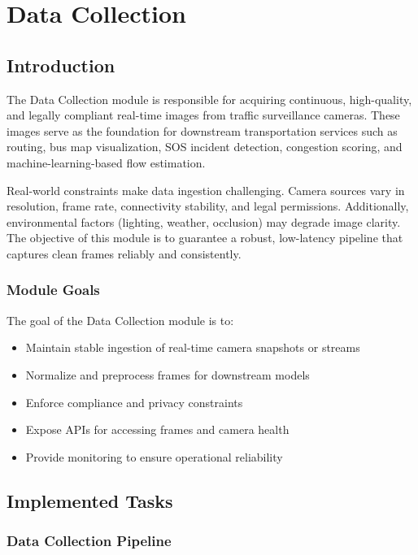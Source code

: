\chapter{Data Collection}
\label{chap:data-collection}

\section{Introduction}

The Data Collection module is responsible for acquiring continuous, high-quality, and legally compliant real-time images from traffic surveillance cameras. These images serve as the foundation for downstream transportation services such as routing, bus map visualization, SOS incident detection, congestion scoring, and machine-learning-based flow estimation.

Real-world constraints make data ingestion challenging. Camera sources vary in resolution, frame rate, connectivity stability, and legal permissions. Additionally, environmental factors (lighting, weather, occlusion) may degrade image clarity. The objective of this module is to guarantee a robust, low-latency pipeline that captures clean frames reliably and consistently.

\subsection{Module Goals}

The goal of the Data Collection module is to:

\begin{itemize}
    \item Maintain stable ingestion of real-time camera snapshots or streams
    \item Normalize and preprocess frames for downstream models
    \item Enforce compliance and privacy constraints
    \item Expose APIs for accessing frames and camera health
    \item Provide monitoring to ensure operational reliability
\end{itemize}

\section{Implemented Tasks}
\subsection{Data Collection Pipeline}

